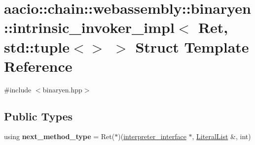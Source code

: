 \hypertarget{structaacio_1_1chain_1_1webassembly_1_1binaryen_1_1intrinsic__invoker__impl_3_01_ret_00_01std_1_1tuple_3_4_01_4}{}\section{aacio\+:\+:chain\+:\+:webassembly\+:\+:binaryen\+:\+:intrinsic\+\_\+invoker\+\_\+impl$<$ Ret, std\+:\+:tuple$<$$>$ $>$ Struct Template Reference}
\label{structaacio_1_1chain_1_1webassembly_1_1binaryen_1_1intrinsic__invoker__impl_3_01_ret_00_01std_1_1tuple_3_4_01_4}


{\ttfamily \#include $<$binaryen.\+hpp$>$}

\subsection*{Public Types}
\begin{DoxyCompactItemize}
\item 
\mbox{\label{structaacio_1_1chain_1_1webassembly_1_1binaryen_1_1intrinsic__invoker__impl_3_01_ret_00_01std_1_1tuple_3_4_01_4_afbfc1edb81eae40a9f474b29d92998e4}} 
using {\bfseries next\+\_\+method\+\_\+type} = Ret($\ast$)(\mbox{\hyperlink{structaacio_1_1chain_1_1webassembly_1_1binaryen_1_1interpreter__interface}{interpreter\+\_\+interface}} $\ast$, \mbox{\hyperlink{classstd_1_1vector}{Literal\+List}} \&, int)
\end{DoxyCompactItemize}
